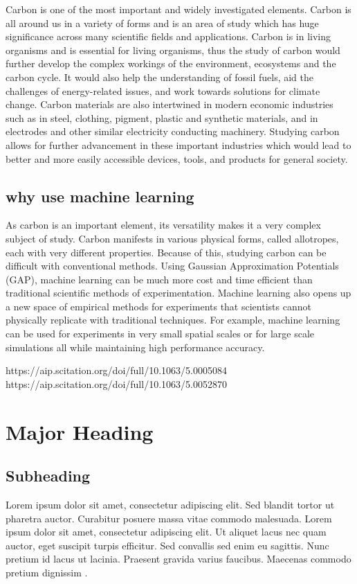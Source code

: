 \documentclass[12pt]{article}
\begin{document}
Carbon is one of the most important and widely investigated elements. Carbon is all around us in a variety of forms and is an area of study which has huge significance across many scientific fields and applications. Carbon is in living organisms and is essential for living organisms, thus the study of carbon would further develop the complex workings of the environment, ecosystems and the carbon cycle. It would also help the understanding of fossil fuels, aid the challenges of energy-related issues, and work towards solutions for climate change. Carbon materials are also intertwined in modern economic industries such as in steel, clothing, pigment, plastic and synthetic materials, and in electrodes and other similar electricity conducting machinery. Studying carbon allows for further advancement in these important industries which would lead to better and more easily accessible devices, tools, and products for general society.

\subsection*{why use machine learning}
As carbon is an important element, its versatility makes it a very complex subject of study. Carbon manifests in various physical forms, called allotropes, each with very different properties. Because of this, studying carbon can be difficult with conventional methods. Using Gaussian Approximation Potentials (GAP), machine learning can be much more cost and time efficient than traditional scientific methods of experimentation. Machine learning also opens up a new space of empirical methods for experiments that scientists cannot physically replicate with traditional techniques. For example, machine learning can be used for experiments in very small spatial scales or for large scale simulations all while maintaining high performance accuracy.

https://aip.scitation.org/doi/full/10.1063/5.0005084
\\ https://aip.scitation.org/doi/full/10.1063/5.0052870


\section*{Major Heading}
\subsection*{Subheading}

Lorem ipsum dolor sit amet, consectetur adipiscing elit. Sed blandit tortor ut pharetra auctor. Curabitur posuere massa vitae commodo malesuada. Lorem ipsum dolor sit amet, consectetur adipiscing elit. Ut aliquet lacus nec quam auctor, eget suscipit turpis efficitur. Sed convallis sed enim eu sagittis. Nunc pretium id lacus ut lacinia. Praesent gravida varius faucibus. Maecenas commodo pretium dignissim \autocite{cohen_quantifying_2020}. 
\end{document}
